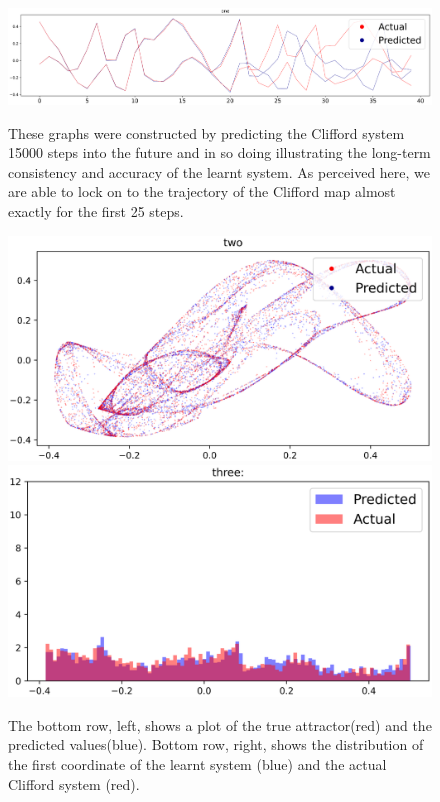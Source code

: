 \documentclass[a4paper,12pt,twoside]{report}
\begin{document}
\begin{figure}[ht]
  \centering
  \includegraphics[width=1.0\textwidth,left]{Clifford_1.eps}
  \caption*{These graphs were constructed by predicting the Clifford system 15000 steps into the future and in so doing illustrating the long-term consistency and accuracy of the learnt system. As perceived here, we are able to lock on to the trajectory of the Clifford map almost exactly for the first 25 steps.}
      \centering
      \includegraphics[width=\linewidth]{Clifford_2.eps}
  \endminipage\hfill
    \centering
    \includegraphics[width=\linewidth]{Clifford_3.eps}
  \endminipage
  \caption{The bottom row, left, shows a plot of the true attractor(red) and the predicted values(blue). Bottom row, right, shows the distribution of the first coordinate of the learnt system (blue) and the actual Clifford system (red). }
  \label{fig:Clifford}
\end{figure}
\end{document}
